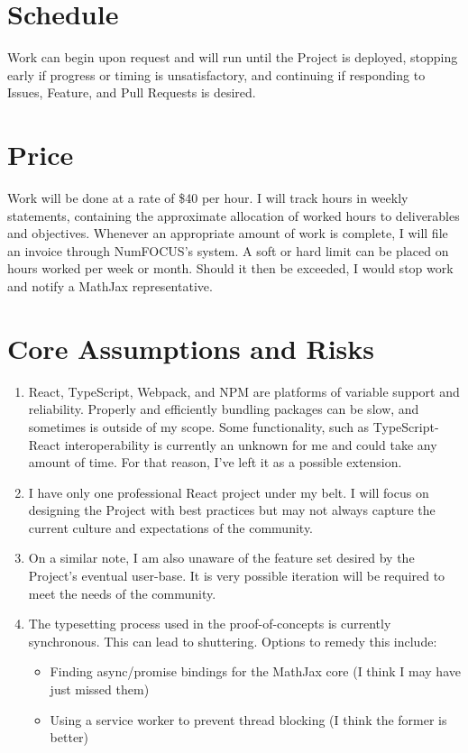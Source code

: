 \documentclass[12pt]{article}
\begin{document}
	\section*{Schedule}
		Work can begin upon request and will run until the Project is deployed, stopping early if progress or timing is unsatisfactory, and continuing if responding to Issues, Feature, and Pull Requests is desired.
	\section*{Price}
		Work will be done at a rate of \$40 per hour. I will track hours in weekly statements, containing the approximate allocation of worked hours to deliverables and objectives. Whenever an appropriate amount of work is complete, I will file an invoice through NumFOCUS's system. A soft or hard limit can be placed on hours worked per week or month. Should it then be exceeded, I would stop work and notify a MathJax representative. 
	\section*{Core Assumptions and Risks}
		\begin{enumerate}
			\item React, TypeScript, Webpack, and NPM are platforms of variable support and reliability. Properly and efficiently bundling packages can be slow, and sometimes is outside of my scope. Some functionality, such as TypeScript-React interoperability is currently an unknown for me and could take any amount of time. For that reason, I've left it as a possible extension.
			\item I have only one professional React project under my belt. I will focus on designing the Project with best practices but may not always capture the current culture and expectations of the community.
			\item On a similar note, I am also unaware of the feature set desired by the Project's eventual user-base. It is very possible iteration will be required to meet the needs of the community.
			\item The typesetting process used in the proof-of-concepts is currently synchronous. This can lead to shuttering. Options to remedy this include:
			\begin{itemize}
				\item Finding async/promise bindings for the MathJax core (I think I may have just missed them)
				\item Using a service worker to prevent thread blocking (I think the former is better)
			\end{itemize}
		\end{enumerate}
\end{document}
